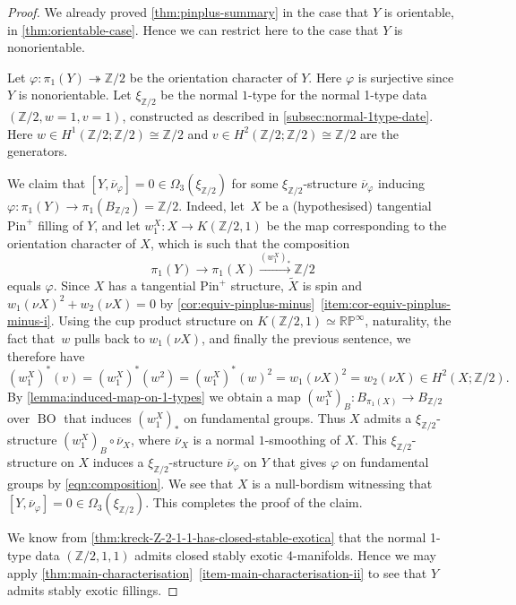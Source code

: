\documentclass[a4paper, reqno]{amsart}
\theoremstyle{definition}
\theoremstyle{remark}
\newcommand{\Z}{\mathbb{Z}}
\newcommand{\pinplus}{{\mathrm{Pin}^+}\!}
\newcommand{\onto}{\twoheadrightarrow}
\newcommand{\ol}{\overline}
\newcommand{\wt}{\widetilde}
\newcommand{\RP}{\mathbb{RP}}
\DeclareMathOperator{\BO}{BO}
\begin{document}
\begin{proof}
We already proved \cref{thm:pinplus-summary} in the case that $Y$ is orientable, in \cref{thm:orientable-case}. Hence we can restrict here to the case that $Y$ is nonorientable. 

Let $\varphi\colon \pi_1(Y)\onto \Z/2$ be the orientation character of $Y$. Here $\varphi$ is surjective since $Y$ is nonorientable. Let $\xi_{\Z/2}$ be the normal $1$-type for the normal 1-type data $(\Z/2,w=1,v=1)$, constructed as described in \cref{subsec:normal-1type-date}. Here $w \in H^1(\Z/2;\Z/2)\cong \Z/2$ and $v \in H^2(\Z/2;\Z/2)\cong \Z/2$ are the generators. 

We claim that $[Y,\overline{\nu}_\varphi]=0\in\Omega_3(\xi_{\Z/2})$ for some $\xi_{\Z/2}$-structure $\overline{\nu}_\varphi$ inducing $\varphi \colon \pi_1(Y) \to \pi_1(B_{\Z/2}) = \Z/2$. Indeed, let~$X$ be a (hypothesised) tangential $\pinplus$ filling of $Y$, and let $w_1^X \colon X \to K(\Z/2,1)$ be the map corresponding to the orientation character of $X$, which is such that the composition 
\begin{equation}\label{eqn:composition}
\pi_1(Y) \to \pi_1(X) \xrightarrow{(w_1^X)_*} \Z/2    
\end{equation} 
equals $\varphi$.  
Since $X$ has a tangential $\pinplus$ structure, $\wt X$ is spin and $w_1(\nu X)^2 + w_2(\nu X) = 0$ by \cref{cor:equiv-pinplus-minus}~\eqref{item:cor-equiv-pinplus-minus-i}. Using the cup product structure on $K(\Z/2,1)\simeq\RP^\infty$, naturality, the fact that~$w$ pulls back to $w_1(\nu X)$, and finally the previous sentence, we therefore have \[(w_1^X)^*(v) = (w_1^X)^*(w^2) = (w_1^X)^*(w)^2 = w_1(\nu X)^2 = w_2(\nu X) \in H^2(X;\Z/2).\] 
By \cref{lemma:induced-map-on-1-types} we obtain a map $(w_1^X)_B \colon B_{\pi_1(X)} \to B_{\Z/2}$ over $\BO$ that induces $(w_1^X)_*$ on fundamental groups. Thus $X$ admits a $\xi_{\Z/2}$-structure $(w_1^X)_B\circ \ol{\nu}_X$, where $\ol{\nu}_X$ is a normal $1$-smoothing of $X$. This $\xi_{\Z/2}$-structure on $X$ induces a $\xi_{\Z/2}$-structure $\ol{\nu}_\varphi$ on $Y$ that gives $\varphi$ on fundamental groups by \eqref{eqn:composition}. We see that $X$ is a null-bordism witnessing that $[Y,\ol{\nu}_\varphi] = 0 \in \Omega_3(\xi_{\Z/2})$. This completes the proof of the claim. 

We know from \cref{thm:kreck-Z-2-1-1-has-closed-stable-exotica}  that the normal 1-type data $(\Z/2,1,1)$ admits closed stably exotic 4-manifolds. 
Hence we may apply \cref{thm:main-characterisation}~\eqref{item-main-characterisation-ii} to see that $Y$ admits stably exotic fillings.
\end{proof}
\end{document}
